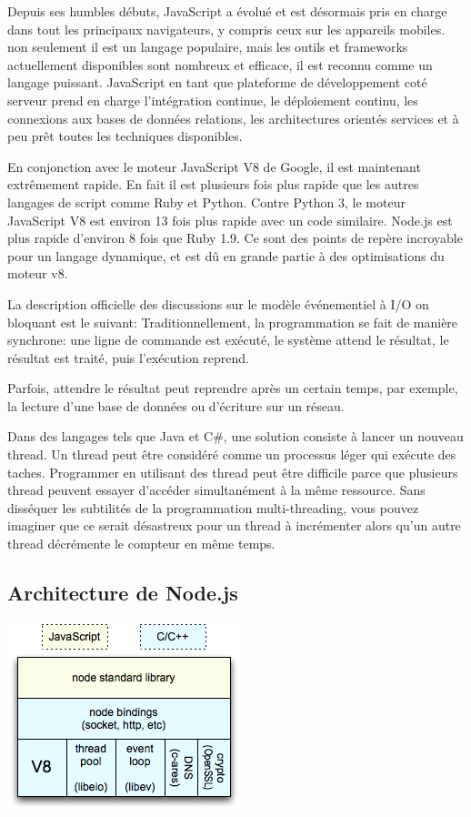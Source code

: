 Depuis ses humbles débuts, JavaScript a évolué et est désormais pris en charge dans tout les principaux navigateurs, y compris ceux sur les appareils mobiles. non seulement il est un langage populaire, mais les outils et frameworks actuellement disponibles sont nombreux et efficace, il est reconnu comme un langage puissant. JavaScript en tant que plateforme de développement coté serveur prend en charge l’intégration continue, le déploiement continu, les connexions aux bases de données relations, les architectures orientés services  et à peu prêt toutes les techniques disponibles.

En conjonction avec le moteur JavaScript V8 de Google, il est maintenant extrêmement rapide. En fait il est plusieurs fois plus rapide que les autres langages de script comme Ruby et Python. Contre Python 3, le moteur JavaScript V8 est environ 13 fois plus rapide avec un code similaire. Node.js est plus rapide d’environ 8 fois que Ruby 1.9. Ce sont des points de repère incroyable pour un langage dynamique, et est dû en grande partie à des optimisations du moteur v8.

La description officielle des discussions sur le modèle événementiel à I/O on bloquant est le suivant: Traditionnellement, la programmation se fait de manière synchrone: une ligne de commande est exécuté, le système attend le résultat, le résultat est traité, puis l’exécution reprend.

Parfois, attendre le résultat peut reprendre après un certain temps, par exemple, la lecture d’une base de données ou d’écriture sur un réseau.

Dans des langages tels que Java et C\#, une solution consiste à lancer un nouveau thread. Un thread peut être considéré comme un processus léger qui exécute des taches. Programmer en utilisant des thread peut être difficile parce que plusieurs thread peuvent essayer d’accéder simultanément à la même ressource. Sans disséquer les subtilités de la programmation multi-threading, vous pouvez imaginer que ce serait désastreux pour un thread à incrémenter alors qu’un autre thread décrémente le compteur en même temps.



\subsection{Architecture de Node.js}

\begin{center}
\includegraphics[scale=1]{img/nodejsarch.png}
\label{Graphique technologie node.js}
\end{center}

